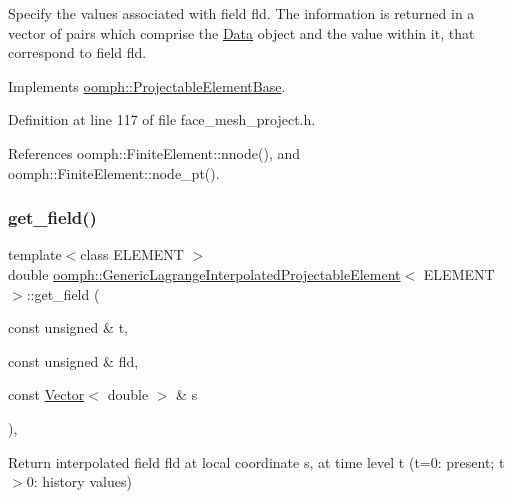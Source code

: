 Specify the values associated with field fld. The information is returned in a vector of pairs which comprise the \hyperlink{classoomph_1_1Data}{Data} object and the value within it, that correspond to field fld. 



Implements \hyperlink{classoomph_1_1ProjectableElementBase_a644306ebdf16f334344c2d27d72f18b7}{oomph\+::\+Projectable\+Element\+Base}.



Definition at line 117 of file face\+\_\+mesh\+\_\+project.\+h.



References oomph\+::\+Finite\+Element\+::nnode(), and oomph\+::\+Finite\+Element\+::node\+\_\+pt().

\mbox{\label{classoomph_1_1GenericLagrangeInterpolatedProjectableElement_a788234ec49e0702b4af030d03a454adc}} 
\subsubsection{\texorpdfstring{get\+\_\+field()}{get\_field()}}
{\footnotesize\ttfamily template$<$class E\+L\+E\+M\+E\+NT $>$ \\
double \hyperlink{classoomph_1_1GenericLagrangeInterpolatedProjectableElement}{oomph\+::\+Generic\+Lagrange\+Interpolated\+Projectable\+Element}$<$ E\+L\+E\+M\+E\+NT $>$\+::get\+\_\+field (\begin{DoxyParamCaption}\item[{const unsigned \&}]{t,  }\item[{const unsigned \&}]{fld,  }\item[{const \hyperlink{classoomph_1_1Vector}{Vector}$<$ double $>$ \&}]{s }\end{DoxyParamCaption})\hspace{0.3cm}{\ttfamily [inline]}, {\ttfamily [virtual]}}



Return interpolated field fld at local coordinate s, at time level t (t=0\+: present; t$>$0\+: history values) 



